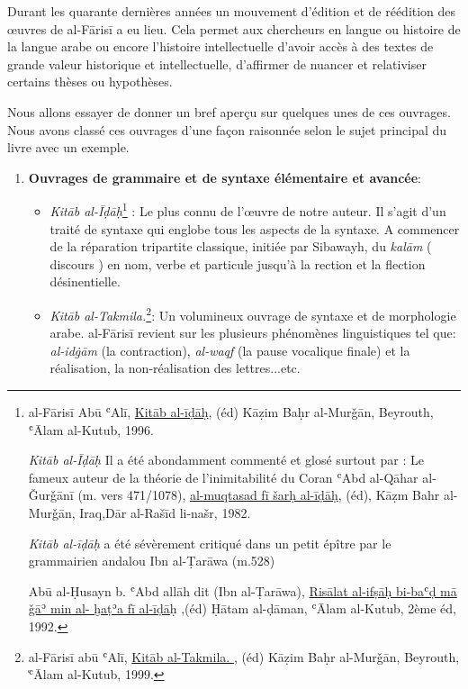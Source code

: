 \documentclass[a4paper,12pt]{report}
\begin{document}
\begin{itemize}
Durant les quarante dernières années un mouvement d’édition et de réédition des œuvres  de al-Fārisī a eu lieu. Cela permet aux chercheurs  en langue ou histoire de la langue  arabe ou encore l’histoire intellectuelle d’avoir accès à des textes de grande valeur  historique et intellectuelle, d’affirmer de nuancer et relativiser certains thèses ou hypothèses.

Nous allons essayer de donner un bref aperçu sur quelques unes de ces ouvrages. Nous avons classé ces ouvrages  d'une façon raisonnée selon le sujet principal du livre avec un exemple.  

\begin{enumerate}
    \item  \textbf{Ouvrages de grammaire et de syntaxe élémentaire et avancée}:
\begin{itemize}
    \item 	\textit{Kitāb al-Īḍāḥ}\footnote{al-Fārisī Abū ʿAl\=i, \underline{  Kitāb  al-īḍāḥ}, (éd) Kāẓim Baḥr al-Murǧān, Beyrouth,  ʿĀlam al-Kutub, 1996.
    
    \textit{Kitāb al-Īḍāḥ} 
    Il a été abondamment commenté et glosé surtout par :
   Le fameux auteur de la théorie de l'inimitabilité du Coran ʿAbd al-Qāhar al-Ǧurǧānī (m. vers 471/1078),
   \underline {al-muqtasad fī šarḥ al-īḍāḥ}, (éd), Kāẓm Bahr al-Murǧān, Iraq,Dār al-Rašīd li-našr, 1982.
   
   \textit{Kitāb al-īḍāḥ} a été sévèrement critiqué dans un petit épître par le grammairien andalou Ibn al-Ṭarāwa (m.528) 
   
  Abū al-Ḥusayn b. ʿAbd allāh dit (Ibn al-Ṭarāwa),  \underline {Risālat al-ifṣāḥ bi-baʿḍ mā ǧāʾ min al- ḫaṭʾa fī al-īḍā}ḥ ,(éd) Ḥātam al-ḍāman, ʿĀlam al-Kutub, 2ème éd, 1992. }   :
    Le plus connu de l’œuvre de notre auteur. Il s’agit d’un traité de syntaxe qui englobe tous les  aspects de la syntaxe. A commencer de la  réparation tripartite classique, initiée par Sibawayh,   du \textit{kalām} ( discours )   en nom, verbe et particule jusqu'à la rection et la flection désinentielle. 
    
    
    \item \textit{ Kitāb al-Takmila.}\footnote{al-Fāris\=i abū ʿAl\=i, \underline{ Kitāb al-Takmila.  }, (éd) Kāẓim Baḥr al-Murǧān, Beyrouth,   ͑ʿĀlam al-Kutub, 1999.}: 
    Un volumineux ouvrage de syntaxe et de morphologie arabe. 
al-Fāris\=i revient sur les plusieurs phénomènes linguistiques tel que:  \textit{al-idġām} (la contraction), \textit{al-waqf } (la pause vocalique finale) et la réalisation, la non-réalisation des lettres...etc. 



\end{itemize}
\end{enumerate}
\end{itemize}
\end{document}
